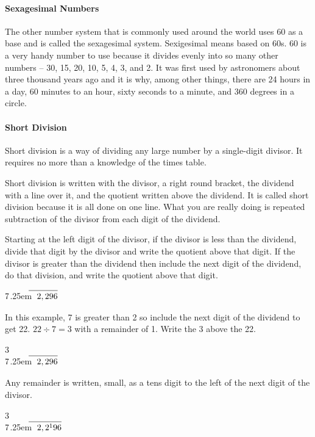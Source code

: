 \documentclass[12pt]{article}
\newcommand\mylongdiv[2]{%
$\strut#1$\kern.25em\smash{\raise.3ex\hbox{$\big)$}}$\mkern-8mu\overline{\quad\strut#2}$}
\begin{document}
\paragraph{Sexagesimal Numbers}
The other number system that is commonly used around the world uses 60 as a base and is called the sexagesimal system. Sexigesimal means based on 60s. 60 is a very handy number to use because it divides evenly into so many other numbers – 30, 15, 20, 10, 5, 4, 3, and 2. It was first used by astronomers about three thousand years ago and it is why, among other things, there are 24 hours in a day, 60 minutes to an hour, sixty seconds to a minute, and 360 degrees in a circle.

\paragraph{Short Division}
Short division is a way of dividing any large number by a single-digit divisor. It requires no more than a knowledge of the times table.

Short division is written with the divisor, a right round bracket, the dividend with a line over it, and the quotient written above the dividend. It is called short division because it is all done on one line. What you are really doing is repeated subtraction of the divisor from each digit of the dividend.

Starting at the left digit of the divisor, if the divisor is less than the dividend, divide that digit by the divisor and write the quotient above that digit. If the divisor is greater than the dividend then include the next digit of the dividend, do that division, and write the quotient above that digit.

\begin{center}
\mylongdiv{7}{2,296}\\
\end{center}

In this example, 7 is greater than 2 so include the next digit of the dividend to get 22. $22 \div 7 = 3$ with a remainder of 1. Write the 3 above the 22.
\begin{center}
\hspace{3.5ex}3\\
\mylongdiv{7}{2,296}\\
\end{center}

Any remainder is written, small, as a tens digit to the left of the next digit of the divisor.
\begin{center}
\hspace{3ex}3\\
\mylongdiv{7}{2,2{^1}96}\\
\end{center}
\end{document}
